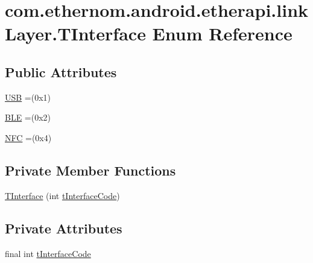 \hypertarget{enumcom_1_1ethernom_1_1android_1_1etherapi_1_1link_layer_1_1_t_interface}{}\section{com.\+ethernom.\+android.\+etherapi.\+link\+Layer.\+T\+Interface Enum Reference}
\label{enumcom_1_1ethernom_1_1android_1_1etherapi_1_1link_layer_1_1_t_interface}
\subsection*{Public Attributes}
\begin{DoxyCompactItemize}
\item 
\mbox{\hyperlink{enumcom_1_1ethernom_1_1android_1_1etherapi_1_1link_layer_1_1_t_interface_a2297eb79567b413c6a2de512ce053492}{U\+SB}} =(0x1)
\item 
\mbox{\hyperlink{enumcom_1_1ethernom_1_1android_1_1etherapi_1_1link_layer_1_1_t_interface_af0ce7a49ee9a2b1f7463132b737cf7bd}{B\+LE}} =(0x2)
\item 
\mbox{\hyperlink{enumcom_1_1ethernom_1_1android_1_1etherapi_1_1link_layer_1_1_t_interface_a1d3afcc2ab0d00f06926081fda415a19}{N\+FC}} =(0x4)
\end{DoxyCompactItemize}
\subsection*{Private Member Functions}
\begin{DoxyCompactItemize}
\item 
\mbox{\hyperlink{enumcom_1_1ethernom_1_1android_1_1etherapi_1_1link_layer_1_1_t_interface_ac921db8b49b2bc459b567d789215bf0f}{T\+Interface}} (int \mbox{\hyperlink{enumcom_1_1ethernom_1_1android_1_1etherapi_1_1link_layer_1_1_t_interface_a26a5181cd65916337379441edf1eddfa}{t\+Interface\+Code}})
\end{DoxyCompactItemize}
\subsection*{Private Attributes}
\begin{DoxyCompactItemize}
\item 
final int \mbox{\hyperlink{enumcom_1_1ethernom_1_1android_1_1etherapi_1_1link_layer_1_1_t_interface_a26a5181cd65916337379441edf1eddfa}{t\+Interface\+Code}}
\end{DoxyCompactItemize}



